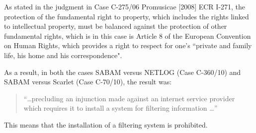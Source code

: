 As stated in the judgment in Case C-275/06 Promusicae [2008] ECR I-271, the protection of the fundamental right to property, which includes the rights linked to intellectual property, must be balanced against the protection of other fundamental rights, which is in this case is Article 8 of the European Convention on Human Rights, which provides a right to respect for one's ``private and family life, his home and his correspondence".

As a result, in both the cases SABAM versus NETLOG (Case C-360/10) and SABAM versus Scarlet (Case C-70/10), the result was:

\begin{quote}``\dots precluding an injunction made against an internet service provider which requires it to install a system for filtering information \dots'' \end{quote}
This means that the installation of a filtering system is prohibited. 


